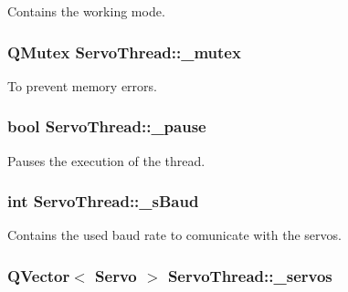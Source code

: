 Contains the working mode. 

\hypertarget{class_servo_thread_a6327eafc0dac189ec1b202d63ef32457}{}
\subsubsection[{\+\_\+mutex}]{\setlength{\rightskip}{0pt plus 5cm}Q\+Mutex Servo\+Thread\+::\+\_\+mutex\hspace{0.3cm}{\ttfamily [private]}}\label{class_servo_thread_a6327eafc0dac189ec1b202d63ef32457}


To prevent memory errors. 

\hypertarget{class_servo_thread_aaf2ef80e8e43518b75d20a5102970d2e}{}
\subsubsection[{\+\_\+pause}]{\setlength{\rightskip}{0pt plus 5cm}bool Servo\+Thread\+::\+\_\+pause\hspace{0.3cm}{\ttfamily [private]}}\label{class_servo_thread_aaf2ef80e8e43518b75d20a5102970d2e}


Pauses the execution of the thread. 

\hypertarget{class_servo_thread_a5b9a41b9e271275b914affb0a845a2ee}{}
\subsubsection[{\+\_\+s\+Baud}]{\setlength{\rightskip}{0pt plus 5cm}int Servo\+Thread\+::\+\_\+s\+Baud\hspace{0.3cm}{\ttfamily [private]}}\label{class_servo_thread_a5b9a41b9e271275b914affb0a845a2ee}


Contains the used baud rate to comunicate with the servos. 

\hypertarget{class_servo_thread_a1ac6662fe6d198b5971ae0ffa7ddfcfd}{}
\subsubsection[{\+\_\+servos}]{\setlength{\rightskip}{0pt plus 5cm}Q\+Vector$<$ {\bf Servo} $>$ Servo\+Thread\+::\+\_\+servos\hspace{0.3cm}{\ttfamily [private]}}\label{class_servo_thread_a1ac6662fe6d198b5971ae0ffa7ddfcfd}


